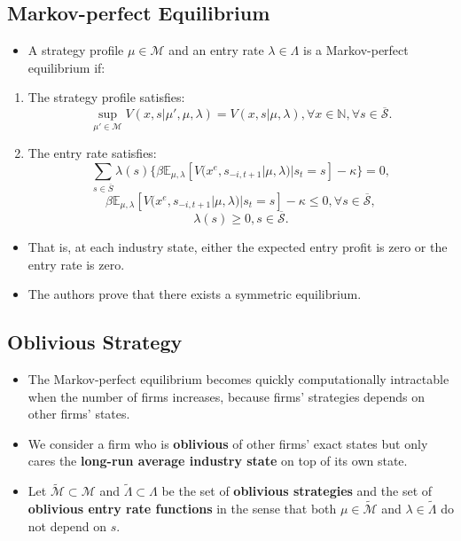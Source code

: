 \documentclass[
]{book}
\providecommand{\tightlist}{%
  \setlength{\itemsep}{0pt}\setlength{\parskip}{0pt}}
\begin{document}
\hypertarget{markov-perfect-equilibrium-2}{%
\subsection{Markov-perfect Equilibrium}\label{markov-perfect-equilibrium-2}}

\begin{itemize}
\tightlist
\item
  A strategy profile \(\mu \in \mathcal{M}\) and an entry rate \(\lambda \in \Lambda\) is a Markov-perfect equilibrium if:
\end{itemize}

\begin{enumerate}
\def\labelenumi{\arabic{enumi}.}
\tightlist
\item
  The strategy profile satisfies:
  \[
  \sup_{\mu' \in \mathcal{M}} V(x, s|\mu', \mu, \lambda) = V(x, s|\mu, \lambda), \forall x \in \mathbb{N}, \forall s \in \overline{\mathcal{S}}.
  \]
\item
  The entry rate satisfies:
  \[
  \sum_{s \in \overline{S}} \lambda(s) \{\beta \mathbb{E}_{\mu, \lambda}[V(x^e, s_{-i, t + 1}|\mu, \lambda)|s_t = s] - \kappa\}
   = 0,
   \]
  \[
   \beta \mathbb{E}_{\mu, \lambda}[V(x^e, s_{-i, t + 1}|\mu, \lambda)|s_t = s] - \kappa \le 0, \forall s \in \mathcal{\overline{S}},
   \]
  \[
   \lambda(s) \ge 0,s \in \mathcal{\overline{S}}.
   \]
\end{enumerate}

\begin{itemize}
\tightlist
\item
  That is, at each industry state, either the expected entry profit is zero or the entry rate is zero.
\item
  The authors prove that there exists a symmetric equilibrium.
\end{itemize}

\hypertarget{oblivious-strategy}{%
\subsection{Oblivious Strategy}\label{oblivious-strategy}}

\begin{itemize}
\tightlist
\item
  The Markov-perfect equilibrium becomes quickly computationally intractable when the number of firms increases, because firms' strategies depends on other firms' states.
\item
  We consider a firm who is \textbf{oblivious} of other firms' exact states but only cares the \textbf{long-run average industry state} on top of its own state.
\item
  Let \(\widetilde{\mathcal{M}} \subset \mathcal{M}\) and \(\widetilde{\Lambda} \subset \Lambda\) be the set of \textbf{oblivious strategies} and the set of \textbf{oblivious entry rate functions} in the sense that both \(\mu \in \widetilde{\mathcal{M}}\) and \(\lambda \in \widetilde{\Lambda}\) do not depend on \(s\).
\end{itemize}
\end{document}
